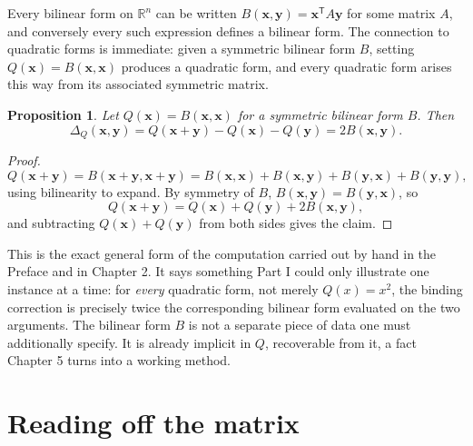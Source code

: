 \documentclass[11pt]{book}
\newtheorem{proposition}[theorem]{Proposition}
\begin{document}
Every bilinear form on $\mathbb{R}^n$ can be written $B(\mathbf{x},\mathbf{y})=\mathbf{x}^{\mathsf T}A\mathbf{y}$ for some matrix $A$, and conversely every such expression defines a bilinear form. The connection to quadratic forms is immediate: given a symmetric bilinear form $B$, setting $Q(\mathbf{x})=B(\mathbf{x},\mathbf{x})$ produces a quadratic form, and every quadratic form arises this way from its associated symmetric matrix.

\begin{proposition}
\label{prop:bilinear-correction}
Let $Q(\mathbf{x})=B(\mathbf{x},\mathbf{x})$ for a symmetric bilinear form $B$. Then
\[
\Delta_Q(\mathbf{x},\mathbf{y}) = Q(\mathbf{x}+\mathbf{y})-Q(\mathbf{x})-Q(\mathbf{y}) = 2B(\mathbf{x},\mathbf{y}).
\]
\end{proposition}
\begin{proof}
\[
Q(\mathbf{x}+\mathbf{y}) = B(\mathbf{x}+\mathbf{y},\mathbf{x}+\mathbf{y}) = B(\mathbf{x},\mathbf{x})+B(\mathbf{x},\mathbf{y})+B(\mathbf{y},\mathbf{x})+B(\mathbf{y},\mathbf{y}),
\]
using bilinearity to expand. By symmetry of $B$, $B(\mathbf{x},\mathbf{y})=B(\mathbf{y},\mathbf{x})$, so
\[
Q(\mathbf{x}+\mathbf{y}) = Q(\mathbf{x})+Q(\mathbf{y})+2B(\mathbf{x},\mathbf{y}),
\]
and subtracting $Q(\mathbf{x})+Q(\mathbf{y})$ from both sides gives the claim.
\end{proof}

This is the exact general form of the computation carried out by hand in the Preface and in Chapter 2. It says something Part I could only illustrate one instance at a time: for \emph{every} quadratic form, not merely $Q(x)=x^2$, the binding correction is precisely twice the corresponding bilinear form evaluated on the two arguments. The bilinear form $B$ is not a separate piece of data one must additionally specify. It is already implicit in $Q$, recoverable from it, a fact Chapter 5 turns into a working method.

\section{Reading off the matrix}
\end{document}
